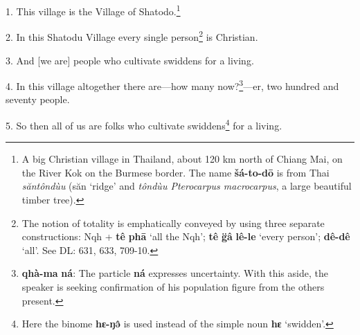 \setcounter{footnote}{0}

1. This village is the Village of Shatodo.\footnote{A big Christian village in Thailand, about 120 km north of Chiang Mai, on the River Kok on the Burmese border. The name \textbf{šá-to-dō} is from Thai \textit{săntôndùu} (săn `ridge' and \textit{tôndùu Pterocarpus macrocarpus}, a large beautiful timber tree).}

2. In this Shatodu Village every single person\footnote{The notion of totality is emphatically conveyed by using three separate constructions: Nqh + \textbf{tê} \textbf{phā} `all the Nqh'; \textbf{tê} \textbf{g̈â} \textbf{lê-le} `every person'; \textbf{dê-dê} `all'. See DL: 631, 633, 709-10.} is Christian.

3. And [we are] people who cultivate swiddens for a living.

4. In this village altogether there are---how many now?\footnote{\textbf{qhà-ma} \textbf{ná}: The particle \textbf{ná} expresses uncertainty. With this aside, the speaker is seeking confirmation of his population figure from the others present.}---er, two hundred and
seventy people.

5. So then all of us are folks who cultivate swiddens\footnote{Here the binome \textbf{hɛ-ŋə̂} is used instead of the simple noun \textbf{hɛ} `swidden'.} for a living.

